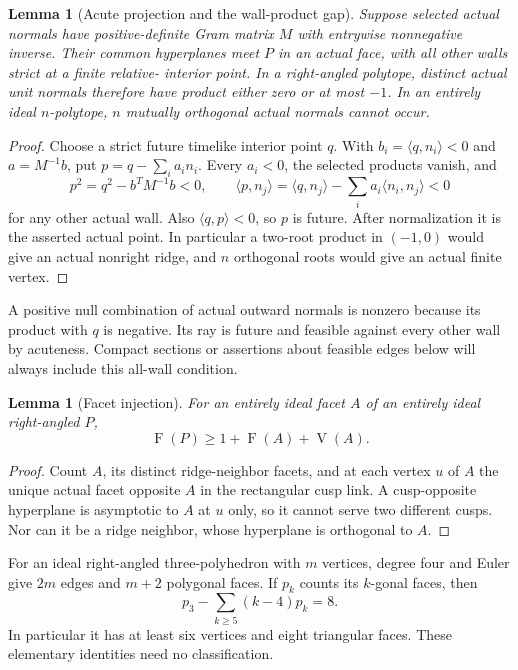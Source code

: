 \documentclass[11pt]{article}
\newtheorem{lemma}[theorem]{Lemma}
\theoremstyle{remark}
\newcommand{\VV}{\operatorname{V}}
\newcommand{\FF}{\operatorname{F}}
\newcommand{\ip}[2]{\langle #1,#2\rangle}
\begin{document}
\begin{lemma}[Acute projection and the wall-product gap]\label{lem:projection}
Suppose selected actual normals have positive-definite Gram matrix $M$
with entrywise nonnegative inverse. Their common hyperplanes meet $P$
in an actual face, with all other walls strict at a finite relative-
interior point. In a right-angled polytope, distinct actual unit normals
therefore have product either zero or at most $-1$.
In an entirely ideal $n$-polytope, $n$ mutually orthogonal actual normals
cannot occur.
\end{lemma}
\begin{proof}
Choose a strict future timelike interior point $q$. With
$b_i=\ip{q}{n_i}<0$ and $a=M^{-1}b$, put $p=q-\sum_i a_i n_i$.
Every $a_i<0$, the selected products vanish, and
\[
 p^2=q^2-b^TM^{-1}b<0,\qquad
 \ip{p}{n_j}=\ip{q}{n_j}-\sum_i a_i\ip{n_i}{n_j}<0
\]
for any other actual wall. Also $\ip{q}{p}<0$, so $p$ is future.
After normalization it is the asserted actual point. In particular a
two-root product in $(-1,0)$ would give an actual nonright ridge, and
$n$ orthogonal roots would give an actual finite vertex.
\end{proof}

A positive null combination of actual outward normals is nonzero
because its product with $q$ is negative. Its ray is future and feasible
against every other wall by acuteness. Compact sections or assertions
about feasible edges below will always include this all-wall condition.

\begin{lemma}[Facet injection]\label{lem:injection}
For an entirely ideal facet $A$ of an entirely ideal right-angled $P$,
\begin{equation}\label{eq:facetInjection}
 \FF(P)\ge1+\FF(A)+\VV(A).
\end{equation}
\end{lemma}
\begin{proof}
Count $A$, its distinct ridge-neighbor facets, and at each vertex $u$
of $A$ the unique actual facet opposite $A$ in the rectangular cusp
link. A cusp-opposite hyperplane is asymptotic to $A$ at $u$ only, so
it cannot serve two different cusps. Nor can it be a ridge neighbor,
whose hyperplane is orthogonal to $A$.
\end{proof}

For an ideal right-angled three-polyhedron with $m$ vertices, degree four
and Euler give $2m$ edges and $m+2$ polygonal faces. If $p_k$ counts
its $k$-gonal faces, then
\begin{equation}\label{eq:threeEuler}
 p_3-\sum_{k\ge5}(k-4)p_k=8.
\end{equation}
In particular it has at least six vertices and eight triangular faces.
These elementary identities need no classification.
\end{document}
